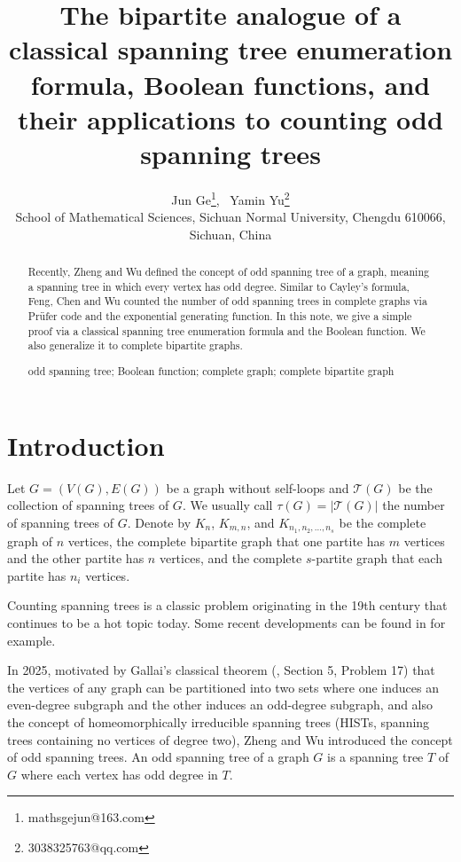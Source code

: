 \documentclass[10pt,a4paper]{article}
\newtheorem{false statement}{False statement}
\theoremstyle{definition}
\begin{document}
\title{\bf\Large The bipartite analogue of a classical spanning tree enumeration formula, Boolean functions, and their applications to counting odd spanning trees}
\date{}

\author{Jun Ge\thanks{mathsgejun@163.com}, \ 
Yamin Yu\thanks{3038325763@qq.com} 
\\[2mm]
\small School of Mathematical Sciences, Sichuan Normal University, Chengdu 610066, Sichuan, China
}


\maketitle

\begin{abstract}
Recently, Zheng and Wu defined the concept of odd spanning tree of a graph, meaning a spanning tree in which every vertex has odd degree. 
Similar to Cayley's formula, Feng, Chen and Wu counted the number of odd spanning trees in complete graphs via Prüfer code and the exponential generating function. In this note, we give a simple proof via a classical spanning tree enumeration formula and the Boolean function. 
We also generalize it to complete bipartite graphs.

\medskip

 odd spanning tree; Boolean function; complete graph; complete bipartite graph 

\end{abstract}

\section{Introduction}

Let $G=(V(G), E(G))$ be a graph without self-loops and $\mathcal{T}(G)$ be the collection of spanning trees of $G$.
We usually call $\tau(G)=|\mathcal{T}(G)|$ the number of spanning trees of $G$. Denote by $K_n$, $K_{m,n}$, and $K_{n_1,n_2,\ldots, n_s}$ 
be the complete graph of $n$ vertices, the complete bipartite graph that one partite has $m$ vertices and the other partite has $n$ vertices, 
and the complete $s$-partite graph that each partite has $n_i$ vertices.

Counting spanning trees is a classic problem originating in the 19th century that continues to be a hot topic today. 
Some recent developments can be found in \cite{DG,DKM,GJ,LCY,LY,Yan,YT} for example. 

In 2025, motivated by Gallai's classical theorem (\cite{Lovasz}, Section 5, Problem 17) that the vertices of 
any graph can be partitioned into two sets 
where one induces an even-degree subgraph and the other induces an odd-degree subgraph, and also the concept of 
homeomorphically irreducible spanning trees (HISTs, spanning trees containing no vertices of degree two), 
Zheng and Wu \cite{ZW} introduced the concept of odd spanning trees. An odd spanning tree of a graph $G$ 
is a spanning tree $T$ of $G$ where each vertex has odd degree in $T$.
\end{document}
